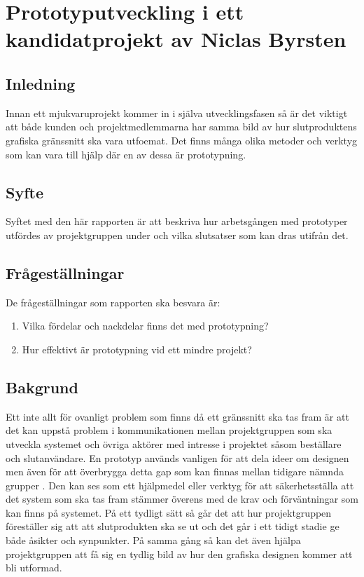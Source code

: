 \chapter{Prototyputveckling i ett kandidatprojekt av Niclas Byrsten}\label{appendix:prototyp}

\section{Inledning}
Innan ett mjukvaruprojekt kommer in i själva utvecklingsfasen så är det viktigt att både kunden och projektmedlemmarna har samma bild av hur slutproduktens grafiska gränssnitt ska vara utfoemat. Det finns många olika metoder och verktyg som kan vara till hjälp där en av dessa är prototypning.  

\section{Syfte}
Syftet med den här rapporten är att beskriva hur arbetsgången med prototyper utfördes av projektgruppen under och vilka slutsatser som kan dras utifrån det.  

\section{Frågeställningar}
De frågeställningar som rapporten ska besvara är:
\begin{enumerate}
    \item Vilka fördelar och nackdelar finns det med prototypning?
    \item Hur effektivt är prototypning vid ett mindre projekt?
\end{enumerate}

\section{Bakgrund}
Ett inte allt för ovanligt problem som finns då ett gränssnitt ska tas fram är att det kan uppstå problem i kommunikationen mellan projektgruppen som ska utveckla systemet och övriga aktörer med intresse i projektet såsom beställare och slutanvändare. En prototyp används vanligen för att dela ideer om designen men även för att överbrygga detta gap som kan finnas mellan tidigare nämnda grupper \cite{caseStudy}. Den kan ses som ett hjälpmedel eller verktyg för att säkerhetsställa att det system som ska tas fram stämmer överens med de krav och förväntningar som kan finns på systemet. På ett tydligt sätt så går det att hur projektgruppen föreställer sig att att slutprodukten ska se ut och det går i ett tidigt stadie ge både åsikter och synpunkter. På samma gång så kan det även hjälpa projektgruppen att få sig en tydlig bild av hur den grafiska designen kommer att bli utformad. 


